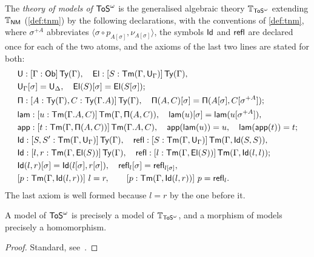 \begin{definition}\label{def:ttos}
    The \emph{theory of models of $\mathsf{ToS}^\omega$} is the generalised algebraic theory $\mathbb{T}_{\mathsf{ToS}^\omega}$ extending $\mathbb{T}_{\mathsf{NM}}$ (\cref{def:tnm}) by the following declarations, with the conventions of \cref{def:tnm}, where $\sigma^{+A}$ abbreviates $\langle \sigma \circ p_{A[\sigma]}, \nu_{A[\sigma]} \rangle$, the symbols $\mathsf{Id}$ and $\mathsf{refl}$ are declared once for each of the two atoms, and the axioms of the last two lines are stated for both:
    \begin{align*}
        &\mathsf{U} : [\Gamma : \mathsf{Ob}]\,\mathsf{Ty}(\Gamma), \quad \mathsf{El} : [S : \mathsf{Tm}(\Gamma, \mathsf{U}_\Gamma)]\,\mathsf{Ty}(\Gamma),\\
        &\mathsf{U}_\Gamma[\sigma] = \mathsf{U}_\Delta, \quad \mathsf{El}(S)[\sigma] = \mathsf{El}(S[\sigma]);\\
        &\mathsf{\Pi} : [A : \mathsf{Ty}(\Gamma), C : \mathsf{Ty}(\Gamma.A)]\,\mathsf{Ty}(\Gamma), \quad \mathsf{\Pi}(A, C)[\sigma] = \mathsf{\Pi}(A[\sigma], C[\sigma^{+A}]);\\
        &\mathsf{lam} : [u : \mathsf{Tm}(\Gamma.A, C)]\,\mathsf{Tm}(\Gamma, \mathsf{\Pi}(A, C)), \quad \mathsf{lam}(u)[\sigma] = \mathsf{lam}(u[\sigma^{+A}]),\\
        &\mathsf{app} : [t : \mathsf{Tm}(\Gamma, \mathsf{\Pi}(A, C))]\,\mathsf{Tm}(\Gamma.A, C), \quad \mathsf{app}(\mathsf{lam}(u)) = u, \quad \mathsf{lam}(\mathsf{app}(t)) = t;\\
        &\mathsf{Id} : [S, S' : \mathsf{Tm}(\Gamma, \mathsf{U}_\Gamma)]\,\mathsf{Ty}(\Gamma), \quad \mathsf{refl} : [S : \mathsf{Tm}(\Gamma, \mathsf{U}_\Gamma)]\,\mathsf{Tm}(\Gamma, \mathsf{Id}(S, S)),\\
        &\mathsf{Id} : [l, r : \mathsf{Tm}(\Gamma, \mathsf{El}(S))]\,\mathsf{Ty}(\Gamma), \quad \mathsf{refl} : [l : \mathsf{Tm}(\Gamma, \mathsf{El}(S))]\,\mathsf{Tm}(\Gamma, \mathsf{Id}(l, l));\\
        &\mathsf{Id}(l, r)[\sigma] = \mathsf{Id}(l[\sigma], r[\sigma]), \quad \mathsf{refl}_l[\sigma] = \mathsf{refl}_{l[\sigma]},\\
        &[p : \mathsf{Tm}(\Gamma, \mathsf{Id}(l, r))]\ l = r, \qquad [p : \mathsf{Tm}(\Gamma, \mathsf{Id}(l, r))]\ p = \mathsf{refl}_l.
    \end{align*}
    The last axiom is well formed because $l = r$ by the one before it.
\end{definition}

\begin{lemma}\label{lem:tos-models}
    A model of $\mathsf{ToS}^\omega$ is precisely a model of $\mathbb{T}_{\mathsf{ToS}^\omega}$, and a morphism of models precisely a homomorphism.
\end{lemma}

\begin{proof}
    Standard, see~\cite{Awodey2018,Newstead2018}.
\end{proof}

